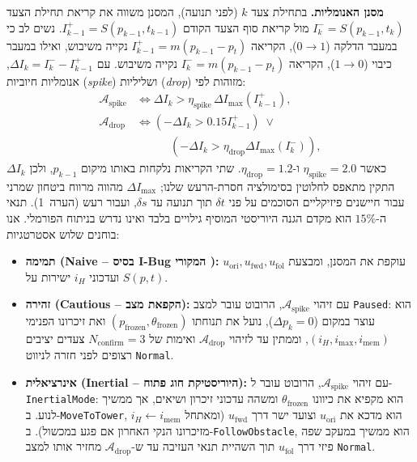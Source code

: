 \documentclass[10pt, a4paper, twocolumn]{article}
\begin{document}
\noindent\textbf{מסנן האנומליות.}
בתחילת צעד $k$ (לפני תנועה), המסנן משווה את קריאת תחילת הצעד $I_k^- = S(p_{k-1}, t_k)$ מול קריאת סוף הצעד הקודם $I_{k-1}^+ = S(p_{k-1}, t_{k-1})$. נשים לב כי במעבר הדלקה ($0 \to 1$), הקריאה $I_{k-1}^+ = m(p_{k-1}-p_t)$ נקייה משיבוש, ואילו במעבר כיבוי ($1 \to 0$), הקריאה $I_k^- = m(p_{k-1}-p_t)$ נקייה משיבוש. עם $\Delta I_k = I_k^- - I_{k-1}^+$, אנומליות חיוביות (\foreignlanguage{english}{\textit{spike}}) ושליליות (\foreignlanguage{english}{\textit{drop}}) מזוהות לפי:
\begin{align}
    \mathcal{A}_{\text{spike}} &\iff \Delta I_k > \eta_{\text{spike}}\,\Delta I_{\max}(I_{k-1}^+), \label{eq:spike} \\
    \mathcal{A}_{\text{drop}} &\iff (-\Delta I_k > 0.15 I_{k-1}^+) \;\lor \nonumber\\
    &\qquad\quad (-\Delta I_k > \eta_{\text{drop}}\Delta I_{\max}(I_k^-)), \label{eq:drop}
\end{align}
כאשר $\eta_{\text{spike}} = 2.0$ ו-$\eta_{\text{drop}} = 1.2$. שתי הקריאות נלקחות באותו מיקום $p_{k-1}$, ולכן $\Delta I_k$ התקין מתאפס לחלוטין בסימולציה חסרת-הרעש שלנו; $\Delta I_{\max}$ מהווה מרווח ביטחון שמרני עבור חיישנים פיזיקליים הסוכמים על פני $\delta t$ תוך תנועה עד $\delta s$, ועבור רעש (הערה~1). תנאי ה-$15\%$ הוא מקדם הגנה היוריסטי המוסיף גילויים בלבד ואינו נדרש בניתוח הפורמלי. אנו בוחנים שלוש אסטרטגיות:
\begin{itemize}
    \item \textbf{תמימה (\foreignlanguage{english}{Naive} -- בסיס \foreignlanguage{english}{I-Bug} המקורי \cite{taylor2014intensity}):} עוקפת את המסנן, ומבצעת $u_{\text{ori}}, u_{\text{fwd}}, u_{\text{fol}}$ ועדכוני $i_H$ ישירות על $S(p, t)$.
    \item \textbf{זהירה (\foreignlanguage{english}{Cautious} -- הקפאת מצב):} עם זיהוי $\mathcal{A}_{\text{spike}}$, הרובוט עובר למצב \foreignlanguage{english}{\texttt{Paused}}: הוא עוצר במקום ($\Delta p_k = 0$), נועל את תנוחתו $(p_{\text{frozen}}, \theta_{\text{frozen}})$ ואת זיכרונו הפנימי $(i_H, i_{\text{max}}, i_{\text{mem}})$, וממתין עד לזיהוי $\mathcal{A}_{\text{drop}}$ ואימות של $N_{\text{confirm}} = 3$ צעדים יציבים רצופים לפני חזרה לניווט \foreignlanguage{english}{\texttt{Normal}}.
    \item \textbf{אינרציאלית (\foreignlanguage{english}{Inertial} -- היוריסטיקת חוג פתוח):} עם זיהוי $\mathcal{A}_{\text{spike}}$, הרובוט עובר ל-\foreignlanguage{english}{\texttt{InertialMode}}: הוא מקפיא את כיוונו $\theta_{\text{frozen}}$ ומשהה עדכוני זיכרון ושיאים, אך ממשיך לנוע. ב-\foreignlanguage{english}{\texttt{MoveToTower}}, הוא מדכא את $u_{\text{ori}}$ וצועד ישר דרך $u_{\text{fwd}}$ (ומאתחל $i_H \leftarrow i_{\text{mem}}$ מזיכרונו הנקי האחרון אם פגע במכשול). ב-\foreignlanguage{english}{\texttt{FollowObstacle}}, הוא ממשיך במעקב שפה פיזי דרך $u_{\text{fol}}$ תוך השהיית תנאי העזיבה עד ש-$\mathcal{A}_{\text{drop}}$ מחזיר אותו למצב \foreignlanguage{english}{\texttt{Normal}}.
\end{itemize}
\end{document}
